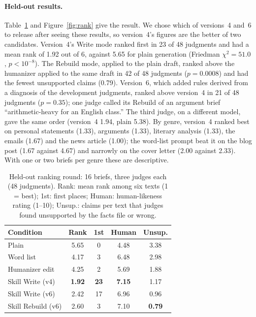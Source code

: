 \documentclass[11pt]{article}
\begin{document}
\paragraph{Held-out results.} Table~\ref{tab:heldout} and Figure~\ref{fig:rank} give the result. We chose which of versions~4 and~6 to release after seeing these results, so version~4's figures are the better of two candidates. Version~4's Write mode ranked first in 23 of 48 judgments and had a mean rank of 1.92 out of 6, against 5.65 for plain generation (Friedman $\chi^2 = 51.0$, $p < 10^{-8}$). The Rebuild mode, applied to the plain draft, ranked above the humanizer applied to the same draft in 42 of 48 judgments ($p = 0.0008$) and had the fewest unsupported claims (0.79). Version~6, which added rules derived from a diagnosis of the development judgments, ranked above version~4 in 21 of 48 judgments ($p = 0.35$); one judge called its Rebuild of an argument brief ``arithmetic-heavy for an English class.'' The third judge, on a different model, gave the same order (version~4 1.94, plain 5.38). By genre, version~4 ranked best on personal statements (1.33), arguments (1.33), literary analysis (1.33), the emails (1.67) and the news article (1.00); the word-list prompt beat it on the blog post (1.67 against 4.67) and narrowly on the cover letter (2.00 against 2.33). With one or two briefs per genre these are descriptive.

\begin{table}[t]
\centering\small
\setlength{\tabcolsep}{3pt}
\begin{tabular}{lcccc}
\toprule
Condition & Rank & 1st & Human & Unsup. \\
\midrule
Plain & 5.65 & 0 & 4.48 & 3.38 \\
Word list & 4.17 & 3 & 6.48 & 2.98 \\
Humanizer edit & 4.25 & 2 & 5.69 & 1.88 \\
Skill Write (v4) & \textbf{1.92} & \textbf{23} & \textbf{7.15} & 1.17 \\
Skill Write (v6) & 2.42 & 17 & 6.96 & 0.96 \\
Skill Rebuild (v6) & 2.60 & 3 & 7.10 & \textbf{0.79} \\
\bottomrule
\end{tabular}
\caption{Held-out ranking round: 16 briefs, three judges each (48 judgments). Rank: mean rank among six texts (1 = best); 1st: first places; Human: human-likeness rating (1--10); Unsup.: claims per text that judges found unsupported by the facts file or wrong.}
\label{tab:heldout}
\end{table}
\end{document}
